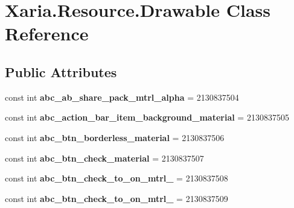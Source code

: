 \hypertarget{classXaria_1_1Resource_1_1Drawable}{}\section{Xaria.\+Resource.\+Drawable Class Reference}
\label{classXaria_1_1Resource_1_1Drawable}
\subsection*{Public Attributes}
\begin{DoxyCompactItemize}
\item 
\mbox{\label{classXaria_1_1Resource_1_1Drawable_af387ddc79fa5af286cf4704957257722}} 
const int {\bfseries abc\+\_\+ab\+\_\+share\+\_\+pack\+\_\+mtrl\+\_\+alpha} = 2130837504
\item 
\mbox{\label{classXaria_1_1Resource_1_1Drawable_ad4d6df5a05d8d5abbfb4353adc0a0aef}} 
const int {\bfseries abc\+\_\+action\+\_\+bar\+\_\+item\+\_\+background\+\_\+material} = 2130837505
\item 
\mbox{\label{classXaria_1_1Resource_1_1Drawable_aebf87d9950a9430e6aefffafae4f42a8}} 
const int {\bfseries abc\+\_\+btn\+\_\+borderless\+\_\+material} = 2130837506
\item 
\mbox{\label{classXaria_1_1Resource_1_1Drawable_a9cc03876f1d0689a69451b27d425d002}} 
const int {\bfseries abc\+\_\+btn\+\_\+check\+\_\+material} = 2130837507
\item 
\mbox{\label{classXaria_1_1Resource_1_1Drawable_a6fdd73c362c68064b1819e04a940d37c}} 
const int {\bfseries abc\+\_\+btn\+\_\+check\+\_\+to\+\_\+on\+\_\+mtrl\+\_} = 2130837508
\item 
\mbox{\label{classXaria_1_1Resource_1_1Drawable_a7bf5b19122d6cb5711e066a8597aa307}} 
const int {\bfseries abc\+\_\+btn\+\_\+check\+\_\+to\+\_\+on\+\_\+mtrl\+\_} = 2130837509
\item 
\mbox{\label{classXaria_1_1Resource_1_1Drawable_a9555a4448d1377b9249296605cdf8ca6}} 

\end{DoxyCompactItemize}
